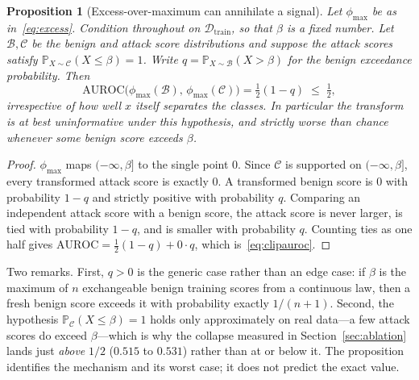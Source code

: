 \documentclass[preprint,12pt,authoryear]{elsarticle}
\newtheorem{proposition}[theorem]{Proposition}
\theoremstyle{definition}
\newcommand{\Prob}{\mathbb{P}}
\newcommand{\Dcal}{\mathcal{D}}
\newcommand{\Ccal}{\mathcal{C}}
\newcommand{\Bcal}{\mathcal{B}}
\begin{document}
\begin{proposition}[Excess-over-maximum can annihilate a signal]\label{prop:clip}
Let $\phi_{\max}$ be as in~\eqref{eq:excess}. Condition throughout on
$\Dcal_{\mathrm{train}}$, so that $\beta$ is a fixed number. Let $\Bcal, \Ccal$ be
the benign and attack score distributions and suppose the attack scores satisfy
$\Prob_{X \sim \Ccal}(X \le \beta) = 1$. Write
$q = \Prob_{X \sim \Bcal}(X > \beta)$ for the benign exceedance probability. Then
\begin{equation}\label{eq:clipauroc}
\mathrm{AUROC}\big(\phi_{\max}(\Bcal),\, \phi_{\max}(\Ccal)\big)
= \tfrac{1}{2}(1 - q) \;\le\; \tfrac{1}{2},
\end{equation}
irrespective of how well $x$ itself separates the classes. In particular the
transform is at best uninformative under this hypothesis, and strictly
\emph{worse} than chance whenever some benign score exceeds $\beta$.
\end{proposition}

\begin{proof}
$\phi_{\max}$ maps $(-\infty, \beta]$ to the single point $0$. Since $\Ccal$ is
supported on $(-\infty,\beta]$, every transformed attack score is exactly $0$. A
transformed benign score is $0$ with probability $1-q$ and strictly positive with
probability $q$. Comparing an independent attack score with a benign score, the
attack score is never larger, is tied with probability $1-q$, and is smaller with
probability $q$. Counting ties as one half gives
$\mathrm{AUROC} = \tfrac{1}{2}(1-q) + 0 \cdot q$, which is~\eqref{eq:clipauroc}.
\end{proof}

Two remarks. First, $q>0$ is the generic case rather than an edge case: if $\beta$
is the maximum of $n$ exchangeable benign training scores from a continuous law,
then a fresh benign score exceeds it with probability exactly $1/(n+1)$. Second,
the hypothesis $\Prob_{\Ccal}(X \le \beta) = 1$ holds only approximately on real
data---a few attack scores do exceed $\beta$---which is why the collapse measured
in Section~\ref{sec:ablation} lands just \emph{above} $1/2$ ($0.515$ to $0.531$)
rather than at or below it. The proposition identifies the mechanism and its worst
case; it does not predict the exact value.
\end{document}

